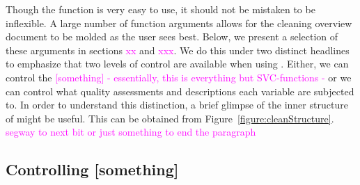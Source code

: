 \documentclass[article]{jss}
\newcommand{\hl}[1]{\textcolor{magenta}{#1}}
\newcommand{\R}[1]{\code{#1}}
\begin{document}
Though the \R{clean()} function is very easy to use, it should not be mistaken to be inflexible. A large number of function arguments allows for the cleaning overview document to be molded as the user sees best. Below, we present a selection of these arguments in sections \hl{xx} and \hl{xxx}. We do this under two distinct headlines to emphasize that two levels of control are available when using \R{clean()}. Either, we can control the \hl{[something] - essentially, this is everything but SVC-functions - } or we can control what quality assessments and descriptions each variable are subjected to. In order to understand this distinction, a brief glimpse of the inner structure of \R{clean()} might be useful. This can be obtained from Figure~\ref{figure:cleanStructure}. \hl{segway to next bit or just something to end the paragraph}


\subsection{Controlling [something]}
\label{subsection:controlSomething}
\end{document}
